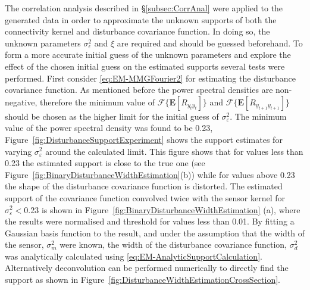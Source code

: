 \documentclass[]{article}
\begin{document}
The correlation analysis described in \S\ref{subsec:CorrAnal} were applied to the generated data in order to approximate the unknown supports of both the connectivity kernel and disturbance covariance function. In doing so, the unknown parameters $\sigma_{\epsilon}^2$ and $\xi$ are required and should be guessed beforehand.  To form a more accurate initial guess of the unknown parameters and explore the effect of the chosen initial guess on the estimated supports several tests were performed. First consider  \eqref{eq:EM-MMGFourier2} for estimating the disturbance covariance function. As mentioned before the power spectral densities are non-negative, therefore the minimum value of $\mathcal F \{\mathbf E\left[ R_{y_ty_t}\right] \}$ and $\mathcal F \{\mathbf E\left[ R_{y_{t+1}y_{t+1}}\right]\}$ should be chosen as the higher limit for the initial guess of $\sigma^2_{\varepsilon}$. The minimum value of the power spectral density was found to be 0.23, Figure~\ref{fig:DisturbanceSupportExperiment} shows the support estimates for varying  $\sigma^2_{\varepsilon}$ around the calculated limit. This figure shows that for values less than 0.23 the estimated support is close to the true one (see Figure~\ref{fig:BinaryDisturbanceWidthEstimation}(b)) while for values above 0.23 the shape of the disturbance covariance function is distorted. The estimated support of the covariance function convolved twice with the sensor kernel for  $\sigma^2_{\varepsilon}<$0.23 is shown in Figure~\ref{fig:BinaryDisturbanceWidthEstimation} (a), where the results were normalised and threshold for values less than 0.01. By fitting a Gaussian basis function to the result, and under the assumption that the width of the sensor, $\sigma_m^2$ were known, the width of the disturbance covariance function, $\sigma_d^2$ was analytically calculated  using \eqref{eq:EM-AnalyticSupportCalculation}. Alternatively deconvolution can be performed numerically to directly find the support as shown in Figure~\ref{fig:DisturbanceWidthEstimationCrossSection}.%
\end{document}
